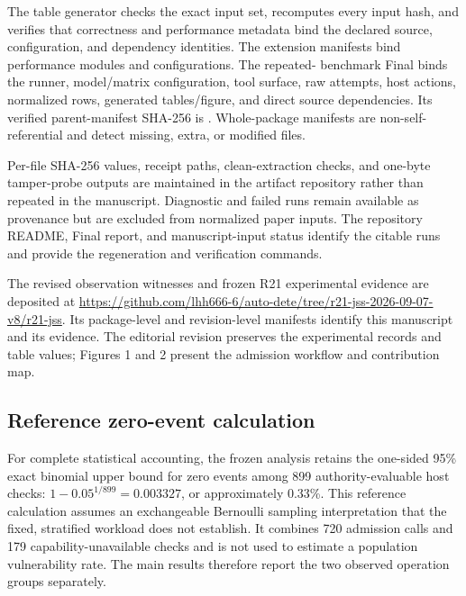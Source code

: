 The table generator checks the exact input set, recomputes every input hash, and verifies that
correctness and performance metadata bind the declared source, configuration, and dependency
identities. The extension manifests bind performance modules and configurations. The repeated-
benchmark Final binds the runner, model/matrix configuration, tool surface, raw attempts, host
actions, normalized rows, generated tables/figure, and direct source dependencies. Its verified
parent-manifest SHA-256 is
.
Whole-package manifests are non-self-referential and detect missing, extra, or modified files.

Per-file SHA-256 values, receipt paths, clean-extraction checks, and one-byte tamper-probe outputs
are maintained in the artifact repository rather than repeated in the manuscript. Diagnostic and
failed runs remain available as provenance but are excluded from normalized paper inputs. The
repository README, Final report, and manuscript-input status identify the citable runs and provide
the regeneration and verification commands.

The revised observation witnesses and frozen R21 experimental evidence are deposited at \url{https://github.com/lhh666-6/auto-dete/tree/r21-jss-2026-09-07-v8/r21-jss}. Its package-level and revision-level manifests identify this manuscript and its evidence. The editorial revision preserves the experimental records and table values; Figures 1 and 2 present the admission workflow and contribution map.


\subsection{Reference zero-event calculation}
\label{app:zero-event}
For complete statistical accounting, the frozen analysis retains the one-sided 95\% exact binomial upper bound for zero events among 899 authority-evaluable host checks: $1-0.05^{1/899}=0.003327$, or approximately 0.33\%. This reference calculation assumes an exchangeable Bernoulli sampling interpretation that the fixed, stratified workload does not establish. It combines 720 admission calls and 179 capability-unavailable checks and is not used to estimate a population vulnerability rate. The main results therefore report the two observed operation groups separately.
